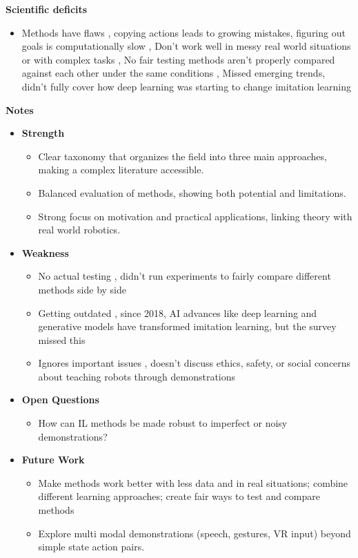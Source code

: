 \documentclass[report.tex]{subfiles}
\begin{document}
\noindent\textbf{Scientific deficits} 
\begin{itemize}
        \item     Methods have flaws , copying actions leads to growing mistakes, figuring out goals is computationally slow , Don't work well in messy real world situations or with complex tasks , No fair testing  methods aren't properly compared against each other under the same conditions , Missed emerging trends, didn't fully cover how deep learning was starting to change imitation learning
\end{itemize}

\noindent\textbf{Notes}
\begin{itemize}
    \item \noindent\textbf {Strength}
    \begin{itemize}
        \item Clear taxonomy that organizes the field into three main approaches, making a complex literature accessible.
        \item Balanced evaluation of methods, showing both potential and limitations.
        \item Strong focus on motivation and practical applications, linking theory with real world robotics.
    \end{itemize}
    
    \item \noindent\textbf{Weakness}
    \begin{itemize}
        \item No actual testing , didn't run experiments to fairly compare different methods side by side 
        \item Getting outdated , since 2018, AI advances like deep learning and generative models have transformed imitation learning, but the survey missed this 
        \item  Ignores important issues , doesn't discuss ethics, safety, or social concerns about teaching robots through demonstrations
    \end{itemize}
\end{itemize}

\begin{itemize}
    \item \noindent\textbf {Open Questions}
    \begin{itemize}
        \item    How can IL methods be made robust to imperfect or noisy demonstrations?

    \end{itemize}
    
    \item \noindent\textbf{Future Work}
    \begin{itemize}
        \item Make methods work better with less data and in real situations; combine different learning approaches; create fair ways to test and compare methods
        \item Explore multi modal demonstrations (speech, gestures, VR input) beyond simple state action pairs. 
        
    \end{itemize}
\end{itemize}
\end{document}
